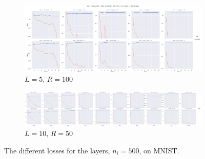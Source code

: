 \documentclass[a4paper]{article}
\begin{document}
\begin{figure}[!ht]
    \centering
    \begin{subfigure}{\textwidth}
        \centering
    \includegraphics[width=\textwidth]{mnist/L_5_w_500_r_100}
\caption{$L = 5$, $R = 100$}
\end{subfigure}
\begin{subfigure}{\textwidth}
    \centering
    \includegraphics[width=\textwidth]{mnist/L_10_w_500_r_50}
    \caption{$L = 10$, $R = 50$}
\end{subfigure}
\caption{The different losses for the layers, $n_i = 500$, on MNIST.}
\label{fig:mnist-classifier}
\end{figure}
\end{document}

